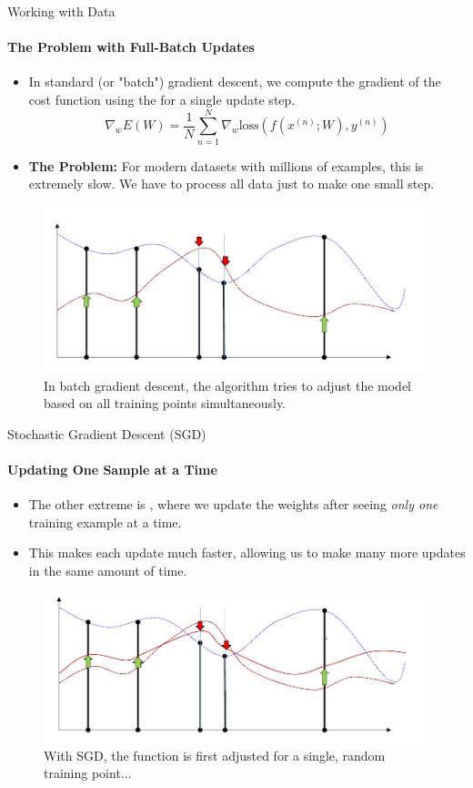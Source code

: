 \begin{frame}{Working with Data}
    \framesubtitle{The Problem with Full-Batch Updates}
    \begin{itemize}
        \item In standard (or "batch") gradient descent, we compute the gradient of the cost function using the  for a single update step.
        \[ \nabla_{w}E(W) = \frac{1}{N} \sum_{n=1}^{N} \nabla_{w}\text{loss}(f(x^{(n)}; W), y^{(n)}) \]
        \item \textbf{The Problem:} For modern datasets with millions of examples, this is extremely slow. We have to process all data just to make one small step.
    \end{itemize}
    \begin{figure}
        \centering
        \includegraphics[width=0.7\linewidth]{images/full_batch_idea.png}
        \caption{In batch gradient descent, the algorithm tries to adjust the model based on all training points simultaneously.}
    \end{figure}
\end{frame}

\begin{frame}{Stochastic Gradient Descent (SGD)}
    \framesubtitle{Updating One Sample at a Time}
    \begin{itemize}
        \item The other extreme is , where we update the weights after seeing \emph{only one} training example at a time.
        \item This makes each update much faster, allowing us to make many more updates in the same amount of time.
    \end{itemize}
    \begin{figure}
        \centering
        \includegraphics[width=0.7\linewidth]{images/sgd_step_1.png}
        \caption{With SGD, the function is first adjusted for a single, random training point...}
    \end{figure}
\end{frame}

